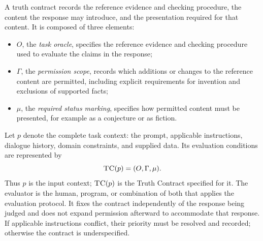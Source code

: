 \documentclass{clv2025}
\newcommand{\TC}{\textsc{TC}}
\begin{document}
A truth contract records the reference evidence and checking procedure,
the content the response may introduce, and the presentation required for
that content. It is composed of three elements:
\begin{itemize}
\item $O$, the \emph{task oracle}, specifies the reference evidence and
checking procedure used to evaluate the claims in the response;
\item $\Gamma$, the \emph{permission scope}, records which additions or
changes to the reference content are permitted, including explicit
requirements for invention and exclusions of supported facts;
\item $\mu$, the \emph{required status marking}, specifies how permitted
content must be presented, for example as a conjecture or as fiction.
\end{itemize}
Let $p$ denote the complete task context: the prompt, applicable instructions,
dialogue history, domain constraints, and supplied data. Its evaluation
conditions are represented by
\begin{equation}
\TC(p)=(O,\Gamma,\mu).
\label{eq:truth-contract}
\end{equation}
Thus $p$ is the input context; $\TC(p)$ is the Truth Contract specified for it.
The evaluator is the human, program, or combination of both that applies
the evaluation protocol. It fixes the contract independently of the response
being judged and does not expand permission afterward to accommodate that
response. If applicable instructions conflict, their priority must be
resolved and recorded; otherwise the contract is underspecified.
\end{document}
